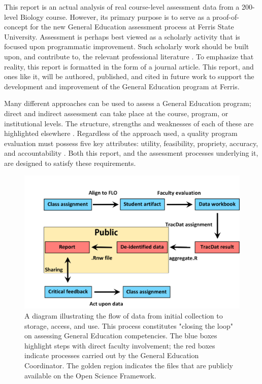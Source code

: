 \documentclass[fleqn,10pt]{SelfArx}\usepackage[]{graphicx}\usepackage[]{color}
\begin{document}
This report is an actual analysis of real course-level assessment data from a 200-level Biology course. However, its primary purpose is to serve as a proof-of-concept for the new General Education assessment process at Ferris State University. Assessment is perhaps best viewed as a scholarly activity that is focused upon programmatic improvement. Such scholarly work should be built upon, and contribute to, the relevant professional literature \citep{Weimer2015}. To emphasize that reality, this report is formatted in the form of a journal article. This report, and ones like it, will be authored, published, and cited in future work to support the development and improvement of the General Education program at Ferris.

Many different approaches can be used to assess a General Education program; direct and indirect assessment can take place at the course, program, or institutional levels. The structure, strengths and weaknesses of each of these are highlighted elsewhere \citep{Allen2006a}. Regardless of the approach used, a quality program evaluation must possess five key attributes: utility, feasibility, propriety, accuracy, and accountability \citep{Yarbrough2011}. Both this report, and the assessment processes underlying it, are designed to satisfy these requirements.

\begin{figure}[htb]\centering %
\includegraphics[width=\textwidth]{./art/process}
\protect\caption{A diagram illustrating the flow of data from initial collection to storage, access, and use. This process constitutes "closing the loop" on assessing General Education competencies. The blue boxes highlight steps with direct faculty involvement; the red boxes indicate processes carried out by the General Education Coordinator. The golden region indicates the files that are publicly available on the Open Science Framework.}
\label{fig:process}
\end{figure}
\end{document}
